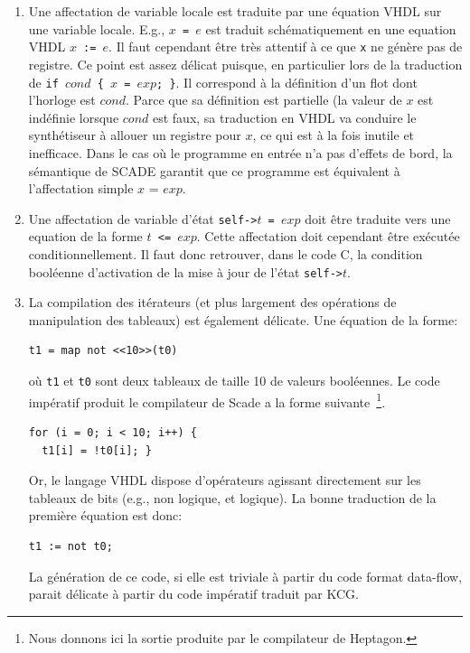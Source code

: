 \documentclass[a4paper]{article}
\newcommand{\scade}{{\sc Scade}}
\newcommand{\heptagon}{{\sc Heptagon}}
\begin{document}
\begin{enumerate}
\item Une affectation de variable locale est traduite par une \'equation
  VHDL sur une variable locale. E.g., \texttt{$x$ = $e$} est traduit
  sch\'ematiquement en une equation VHDL \texttt{$x$ := $e$}.  Il faut
  cependant \^etre tr\`es attentif \`a ce que \verb-x- ne g\'en\`ere pas de
  registre.  Ce point est assez d\'elicat puisque, en particulier lors
  de la traduction de \texttt{if $cond$ \{ $x$ = $exp$; \}}. Il
  correspond \`a la d\'efinition d'un flot dont l'horloge est
  $cond$. Parce que sa d\'efinition est partielle (la valeur de $x$ est
  ind\'efinie lorsque $cond$ est faux, sa traduction en VHDL va conduire
  le synth\'etiseur \`a allouer un registre pour $x$, ce qui est \`a la fois
  inutile et inefficace.  Dans le cas o\`u le programme en entr\'ee n'a
  pas d'effets de bord, la s\'emantique de SCADE garantit que ce
  programme est \'equivalent \`a l'affectation simple $x$ = $exp$.
\item Une affectation de variable d'\'etat \texttt{self->$t$ =
    $exp$} doit \^etre traduite vers une equation de la forme
  \texttt{$t$ <= $exp$}. Cette affectation doit cependant \^etre ex\'ecut\'ee
  conditionnellement. Il faut donc retrouver, dans le code C,
  la condition bool\'eenne d'activation de la mise \`a jour de
  l'\'etat \texttt{self->$t$}.
\item La compilation des it\'erateurs (et plus largement des op\'erations de
manipulation des tableaux) est \'egalement d\'elicate. Une \'equation de la forme:
\begin{verbatim}
t1 = map not <<10>>(t0)
\end{verbatim}
o\`u \verb-t1- et \verb-t0- sont deux tableaux de taille 10 de valeurs
bool\'eennes. Le code imp\'eratif produit le compilateur de \scade{} a
la forme suivante~\footnote{Nous donnons ici la sortie produite par le
  compilateur de \heptagon.}.
\begin{verbatim}
for (i = 0; i < 10; i++) {
  t1[i] = !t0[i]; }
\end{verbatim}
Or, le langage VHDL dispose d'op\'erateurs agissant directement sur les
tableaux de bits (e.g., non logique, et logique). La bonne traduction
de la premi\`ere \'equation est donc:
\begin{verbatim}
t1 := not t0;
\end{verbatim}
La g\'en\'eration de ce code, si elle est triviale \`a partir du code format data-flow,
parait d\'elicate \`a partir du code imp\'eratif traduit par KCG.
\end{enumerate}
\end{document}
